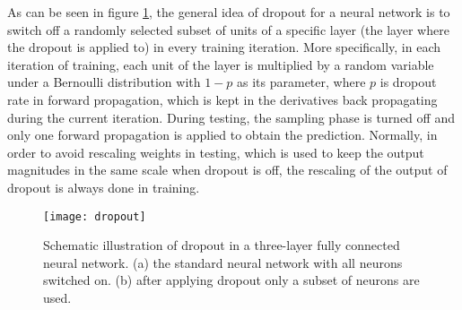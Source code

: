 As can be seen in figure \ref{fig:dropout}, the general idea of dropout for a neural network is to switch off a randomly selected subset of units of a specific layer (the layer where the dropout is applied to) in every training iteration.
More specifically, in each iteration of training, each unit of the layer is multiplied by a random variable under a Bernoulli distribution with $1-p$ as its parameter, where $p$ is dropout rate in forward propagation, which is kept in the derivatives back propagating during the current iteration.
During testing, the sampling phase is turned off and only one forward propagation is applied to obtain the prediction. 
Normally, in order to avoid rescaling weights in testing, which is used to keep the output magnitudes in the same scale when dropout is off, the rescaling of the output of dropout is always done in training. 
\begin{figure}[H]
	\begin{center}
		\texttt{[image: dropout]}
		\caption{Schematic illustration of dropout in a three-layer fully connected neural network. (a) the standard neural network with all neurons switched on. (b) after applying dropout only a subset of neurons are used\cite{srivastava2014dropout}.}		
		\label{fig:dropout}
	\end{center}
\end{figure}


